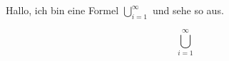 \documentclass[12pt,ngerman]{scrartcl}
\begin{document}
\blindtext Hallo, ich bin eine Formel \( \displaystyle  \bigcup_{i=1}^{\infty} \) und sehe so aus. \blindtext

\begin{equation}
\scriptstyle  \bigcup_{i=1}^{\infty} 
\end{equation}
\end{document}
